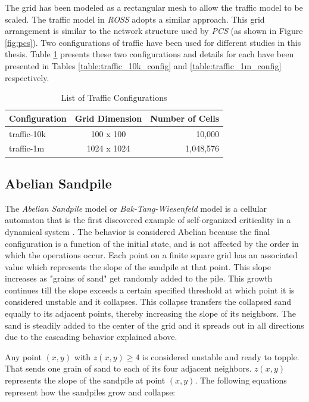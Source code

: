 \documentclass[11pt]{book}
\begin{document}
The grid has been modeled as a rectangular mesh to allow the traffic model to be scaled.  The traffic model in
\emph{ROSS} adopts a similar approach.  This grid arrangement is similar to the network structure used by
\emph{PCS} (as shown in Figure \ref{fig:pcs}).  Two configurations of traffic have been used for different
studies in this thesis.  Table \ref{table:traffic_configs} presents these two configurations and details for
each have been presented in Tables \ref{table:traffic_10k_config} and \ref{table:traffic_1m_config} respectively.

\begin{table}
    \centering
    \begin{tabular}{| l | c | r |}
        \hline
        \textbf{Configuration} & \textbf{Grid Dimension} & \textbf{Number of Cells}\\
        \hline
        traffic-10k     &  100 x 100    & 10,000\\
        traffic-1m      & 1024 x 1024   & 1,048,576\\
        \hline
    \end{tabular}
    \caption{List of Traffic Configurations}\label{table:traffic_configs}
\end{table}

\subsection{Abelian Sandpile}\label{subsec:sandpile}

The \emph{Abelian Sandpile} model or \emph{Bak-Tang-Wiesenfeld} model is a cellular automaton that is the
first discovered example of self-organized criticality in a dynamical system \cite{bak-87}.  The behavior is
considered Abelian because the final configuration is a function of the initial state, and is not affected by
the order in which the operations occur.  Each point on a finite square grid has an associated value which
represents the slope of the sandpile at that point.  This slope increases as "grains of sand" get randomly
added to the pile.  This growth continues till the slope exceeds a certain specified threshold at which point
it is considered unstable and it collapses.  This collapse transfers the collapsed sand equally to its
adjacent points, thereby increasing the slope of its neighbors.  The sand is steadily added to the center of
the grid and it spreads out in all directions due to the cascading behavior explained above.

Any point $(x,y)$ with $z(x,y) \geq 4$ is considered unstable and ready to topple.  That sends one grain of
sand to each of its four adjacent neighbors.  $z(x,y)$ represents the slope of the sandpile at point $(x,y)$.
The following equations represent how the sandpiles grow and collapse:
\end{document}
